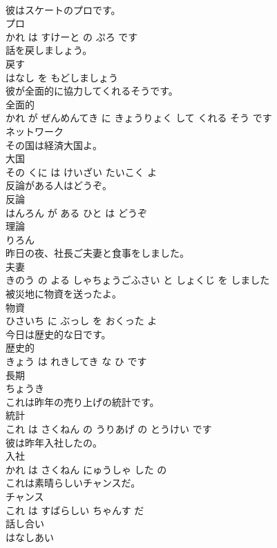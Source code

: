 \documentclass[8pt]{extreport}
\begin{document}
\begin{CJK}{UTF8}{min}
\\	彼はスケートのプロです。	
\\	プロ 
\\	かれ は すけーと の ぷろ です			
\\	話を戻しましょう。	
\\	戻す 
\\	はなし を もどしましょう			
\\	彼が全面的に協力してくれるそうです。	
\\	全面的 
\\	かれ が ぜんめんてき に きょうりょく して くれる そう です			
\\	ネットワーク	
\\	その国は経済大国よ。	
\\	大国 
\\	その くに は けいざい たいこく よ			
\\	反論がある人はどうぞ。	
\\	反論 
\\	はんろん が ある ひと は どうぞ			
\\	理論	
\\	りろん		
\\	昨日の夜、社長ご夫妻と食事をしました。	
\\	夫妻 
\\	きのう の よる しゃちょうごふさい と しょくじ を しました			
\\	被災地に物資を送ったよ。	
\\	物資 
\\	ひさいち に ぶっし を おくった よ			
\\	今日は歴史的な日です。	
\\	歴史的 
\\	きょう は れきしてき な ひ です			
\\	長期	
\\	ちょうき		
\\	これは昨年の売り上げの統計です。	
\\	統計 
\\	これ は さくねん の うりあげ の とうけい です			
\\	彼は昨年入社したの。	
\\	入社 
\\	かれ は さくねん にゅうしゃ した の			
\\	これは素晴らしいチャンスだ。	
\\	チャンス 
\\	これ は すばらしい ちゃんす だ			
\\	話し合い	
\\	はなしあい		

\end{CJK}
\end{document}
